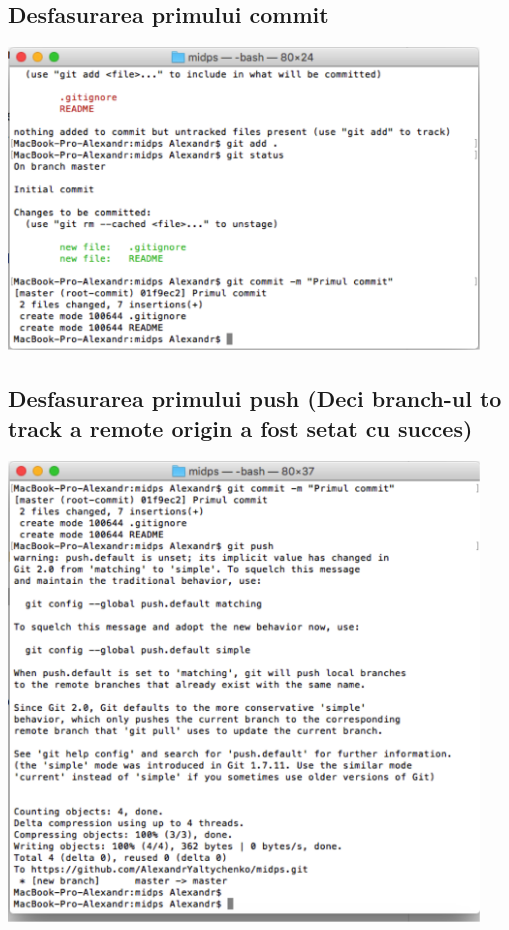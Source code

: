 \documentclass[12pt]{article}
\begin{document}
\subsection{Desfasurarea primului commit}
\includegraphics[width=12.5cm]{images/10}
\subsection{Desfasurarea primului push (Deci branch-ul to track a remote origin a fost setat cu succes)}
\includegraphics[width=12.5cm]{images/11}
\end{document}
